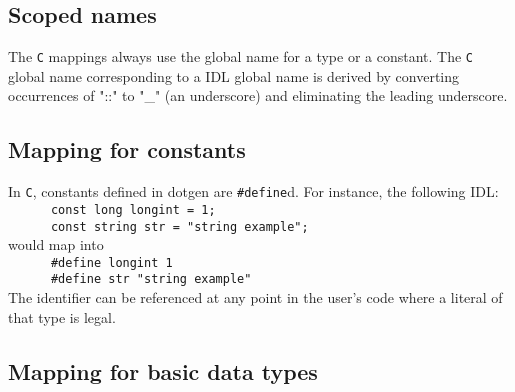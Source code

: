 %
%
%
%
%

\subsection{Scoped names}

The {\tt C} mappings always use the  global name for a type or a constant.  The
{\tt C} global  name corresponding to a \GenoM{} IDL global  name is derived by
converting  occurrences of  "::" to  "\_" (an  underscore) and  eliminating the
leading underscore.


\subsection{Mapping for constants}

In {\tt C}, constants defined in dotgen are {\tt \#define}d. For instance, the
following IDL:\hfill\\
\verb|      const long longint = 1;|\hfill\\
\verb|      const string str = "string example";|\hfill\\
would map into\hfill\\
\verb|      #define longint 1|\hfill\\
\verb|      #define str "string example"|\hfill\\

The  identifier can  be referenced  at any  point in  the user's  code  where a
literal of that type is legal.


\subsection{Mapping for basic data types}

